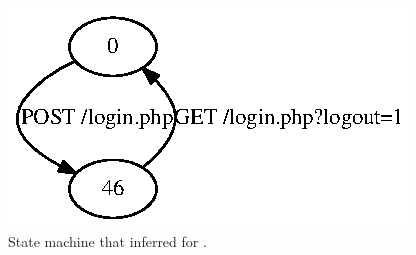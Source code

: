 \begin{figure}[tb]
  \centering
  \includegraphics{figures/scarf.ps}
  \caption{State machine that \crawler{} inferred for \scarf{}.}
\end{figure}
